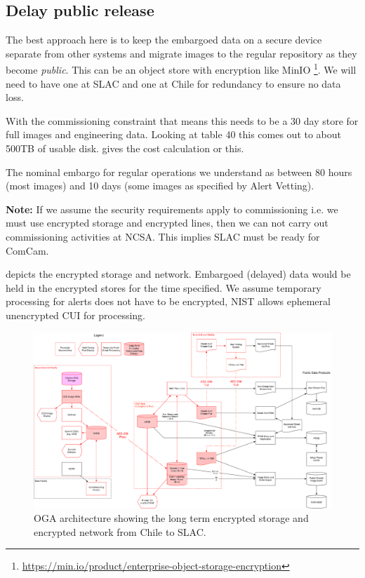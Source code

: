 
\subsection{Delay public release} \label{sec:3delay}

The best approach here is to keep the embargoed data on a secure device separate from other systems and migrate images to the regular repository as they become \emph{public}.
This can be an object store with encryption like MinIO \footnote{\url{ https://min.io/product/enterprise-object-storage-encryption}}.
We will need to have one at SLAC and one at Chile for redundancy to ensure no data loss.

With the commissioning constraint that means this needs to be a 30 day store  for full images and engineering data.
Looking at 
table 40 this comes out to about 500TB of usable disk.
 gives the cost calculation or this.

The nominal embargo for regular operations we understand as between 80 hours (most images) and 10 days (some images as specified by Alert Vetting).




{\bf Note:} If we assume the security requirements apply to commissioning i.e. we must use encrypted storage and encrypted lines, then we can not carry out commissioning activities at NCSA. This implies SLAC must be ready for ComCam.

 depicts the encrypted storage and network. Embargoed (delayed) data would be held in the encrypted stores for the time specified.
We assume temporary processing for alerts does not have to be encrypted, NIST allows ephemeral unencrypted CUI for processing.

\begin{figure}
\begin{centering}
\includegraphics[width=\textwidth]{OGA_Diagram}
	\caption{ OGA architecture  showing the long term encrypted storage and encrypted network from Chile to SLAC. \label{fig:arch}}
\end{centering}
\end{figure}
